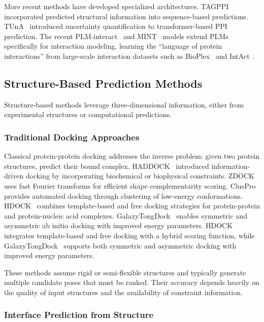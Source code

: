 More recent methods have developed specialized architectures. TAGPPI~\cite{xie2022tagppi} incorporated predicted structural information into sequence-based predictions. TUnA~\cite{gehring2024tuna} introduced uncertainty quantification to transformer-based PPI prediction. The recent PLM-interact~\cite{zhao2025plminteract} and MINT~\cite{ullanat2025mint} models extend PLMs specifically for interaction modeling, learning the ``language of protein interactions'' from large-scale interaction datasets such as BioPlex~\cite{huttlin2021bioplex} and IntAct~\cite{orchard2014intact}.

\subsection{Structure-Based Prediction Methods}
\label{subsec:structure}

Structure-based methods leverage three-dimensional information, either from experimental structures or computational predictions.

\subsubsection{Traditional Docking Approaches}

Classical protein-protein docking addresses the inverse problem: given two protein structures, predict their bound complex. HADDOCK~\cite{dominguez2003haddock} introduced information-driven docking by incorporating biochemical or biophysical constraints. ZDOCK~\cite{pierce2014zdock} uses fast Fourier transforms for efficient shape complementarity scoring. ClusPro~\cite{kozakov2017cluspro} provides automated docking through clustering of low-energy conformations. HDOCK~\cite{yan2020hdock} combines template-based and free docking strategies for protein-protein and protein-nucleic acid complexes. GalaxyTongDock~\cite{baek2023galaxytongdock} enables symmetric and asymmetric ab initio docking with improved energy parameters. HDOCK~\cite{yan2020hdock} integrates template-based and free docking with a hybrid scoring function, while GalaxyTongDock~\cite{baek2023galaxytongdock} supports both symmetric and asymmetric docking with improved energy parameters.

These methods assume rigid or semi-flexible structures and typically generate multiple candidate poses that must be ranked. Their accuracy depends heavily on the quality of input structures and the availability of constraint information.

\subsubsection{Interface Prediction from Structure}

